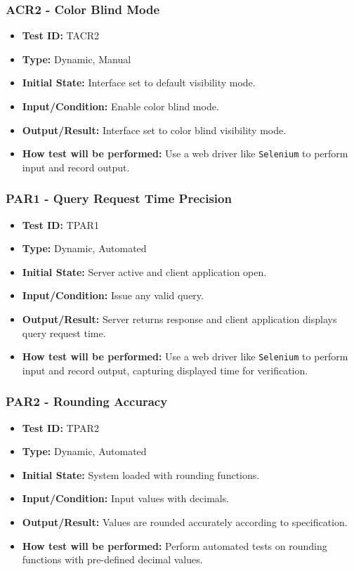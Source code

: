\documentclass[12pt, titlepage]{article}
\begin{document}
\subsubsection{ACR2 - Color Blind Mode}
\begin{itemize}
    \item \textbf{Test ID:} TACR2
    \item \textbf{Type:} Dynamic, Manual
    \item \textbf{Initial State:} Interface set to default visibility mode.
    \item \textbf{Input/Condition:} Enable color blind mode.
    \item \textbf{Output/Result:} Interface set to color blind visibility mode.
    \item \textbf{How test will be performed:} Use a web driver like \texttt{Selenium} to perform input and record output.
\end{itemize}

\subsubsection{PAR1 - Query Request Time Precision}
\begin{itemize}
    \item \textbf{Test ID:} TPAR1
    \item \textbf{Type:} Dynamic, Automated
    \item \textbf{Initial State:} Server active and client application open.
    \item \textbf{Input/Condition:} Issue any valid query.
    \item \textbf{Output/Result:} Server returns response and client application displays query request time.
    \item \textbf{How test will be performed:} Use a web driver like \texttt{Selenium} to perform input and record output, capturing displayed time for verification.
\end{itemize}

\subsubsection{PAR2 - Rounding Accuracy}
\begin{itemize}
    \item \textbf{Test ID:} TPAR2
    \item \textbf{Type:} Dynamic, Automated
    \item \textbf{Initial State:} System loaded with rounding functions.
    \item \textbf{Input/Condition:} Input values with decimals.
    \item \textbf{Output/Result:} Values are rounded accurately according to specification.
    \item \textbf{How test will be performed:} Perform automated tests on rounding functions with pre-defined decimal values.
\end{itemize}
\end{document}
